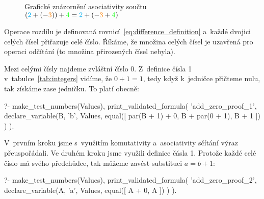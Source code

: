 \begin{figure}[!h]
\centering
{}
\caption{Grafické znázornění asociativity součtu \((\textcolor{cyan}{2} + (-\textcolor{orange}{3})) + \textcolor{green}{4} = \textcolor{cyan}{2} + (-\textcolor{orange}{3} + \textcolor{green}{4})\)}
\label{img:integer_add_asociativity}
\end{figure}


Operace rozdílu je definovaná rovnicí~\eqref{eq:difference_definition} a~každé dvojici celých čísel přiřazuje celé číslo. Říkáme, že množina celých čísel je uzavřená pro operaci odčítání (to množina přirozených čísel nebyla).


Mezi celými čísly najdeme zvláštní číslo 0. Z~definice čísla 1 v~tabulce~\ref{tab:integers} vidíme, že \(0 + 1 = 1\), tedy když k~jedničce přičteme nulu, tak získáme zase jedničku. To platí obecně:

\begin{prolog}
?-	make_test_numbers(Values),
	print_validated_formula(
		'add_zero_proof_1',
		declare_variable(B, 'b', Values,
			equal([
				par(B + 1) + 0,
				B + par(0 + 1),
				B + 1
			])
		)
	).
\end{prolog}

V~prvním kroku jsme s~využitím komutativity a~asociativity sčítání výraz přeuspořádali. Ve druhém kroku jsme využili definice čásla 1. Protože každé celé číslo má svého předchůdce, tak můžeme zavést substituci \(a = b + 1\):

\begin{prolog}
?-	make_test_numbers(Values),
	print_validated_formula(
		'add_zero_proof_2',
		declare_variable(A, 'a', Values,
			equal([
				A + 0,
				A
			])
		)
	).
\end{prolog}

